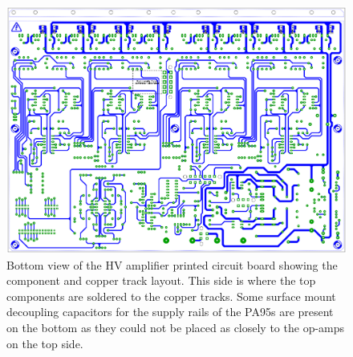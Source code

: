\begin{figure}
  \includegraphics[width=\textwidth]{graphics/60-hv-amp-bottom.pdf}
  \caption[High voltage amplifier board, bottom view]{\label{fig:hv-amp-bottom}Bottom view of the \gls{HV} amplifier printed circuit board showing the component and copper track layout. This side is where the top components are soldered to the copper tracks. Some surface mount decoupling capacitors for the supply rails of the PA95s are present on the bottom as they could not be placed as closely to the op-amps on the top side.}
\end{figure}